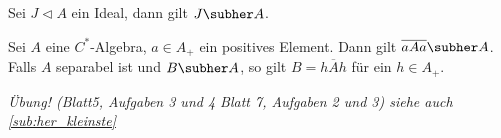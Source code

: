 \begin{korollarB}[{name=[Ideale sind hereditär]}]
	Sei $J \lhd A$ ein Ideal, dann gilt $J \subher A$. 
\end{korollarB}

\begin{korollar}[{name=[hereditäre Unteralgebren der Form $\overline{aAa}$]},label=korr:412]
	Sei $A$ eine $C^*$-Algebra, $a \in A_+$ ein positives Element. 
	Dann gilt $\overline{aAa} \subher A$. 
	Falls $A$ separabel ist und $B \subher A$, so gilt $B=\overline{hAh}$ für ein $h \in A_+$.
\end{korollar}
\begin{beweis}
	\emph{Übung! (Blatt5, Aufgaben 3 und 4 Blatt 7, Aufgaben 2 und 3) siehe auch \cref{sub:her_kleinste}}
\end{beweis}

